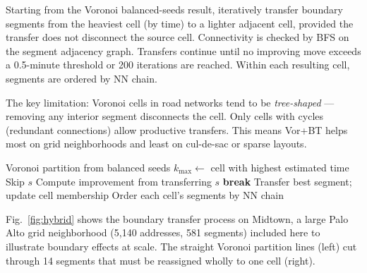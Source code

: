 \documentclass[conference]{IEEEtran}
\begin{document}
Starting from the Voronoi balanced-seeds result, iteratively transfer boundary segments from the heaviest cell (by time) to a lighter adjacent cell, provided the transfer does not disconnect the source cell. Connectivity is checked by BFS on the segment adjacency graph. Transfers continue until no improving move exceeds a 0.5-minute threshold or 200 iterations are reached. Within each resulting cell, segments are ordered by NN chain.

The key limitation: Voronoi cells in road networks tend to be \emph{tree-shaped} --- removing any interior segment disconnects the cell. Only cells with cycles (redundant connections) allow productive transfers. This means Vor+BT helps most on grid neighborhoods and least on cul-de-sac or sparse layouts.

\begin{algorithm}[htbp]
\caption{Voronoi + Boundary Transfer}
\begin{algorithmic}[1]
\REQUIRE Voronoi partition from balanced seeds
    \STATE $k_{\max} \leftarrow$ cell with highest estimated time
            \STATE Skip $s$
        \ENDIF
            \STATE Compute improvement from transferring $s$
        \ENDFOR
    \ENDFOR
        \STATE \textbf{break}
    \ENDIF
    \STATE Transfer best segment; update cell membership
\ENDFOR
\STATE Order each cell's segments by NN chain
\end{algorithmic}
\end{algorithm}

Fig.~\ref{fig:hybrid} shows the boundary transfer process on Midtown, a large Palo Alto grid neighborhood (5,140 addresses, 581 segments) included here to illustrate boundary effects at scale. The straight Voronoi partition lines (left) cut through 14 segments that must be reassigned wholly to one cell (right).
\end{document}
